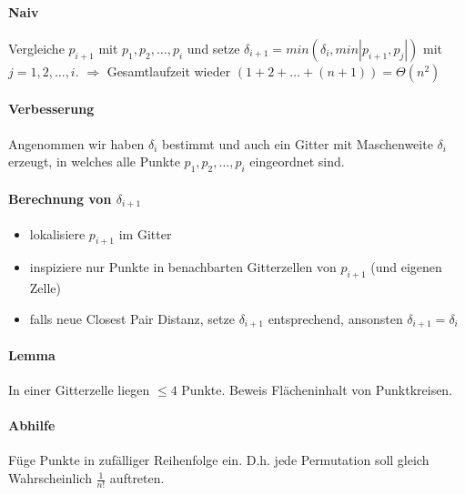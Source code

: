 \paragraph*{Naiv} Vergleiche $p_{i+1}$ mit $p_1,p_2,\dots,p_i$ und setze $\delta_{i+1} = min(\delta_i, min|p_{i+1},p_j|)$ mit $j = 1,2,\dots,i$. $\Rightarrow$ Gesamtlaufzeit wieder $(1+2+\dots+(n+1)) = \Theta(n^2)$

\paragraph*{Verbesserung} Angenommen wir haben $\delta_i$ bestimmt und auch ein Gitter mit Maschenweite $\delta_i$ erzeugt, in welches alle Punkte $p_1,p_2,\dots,p_i$ eingeordnet sind.

\paragraph*{Berechnung von $\delta_{i+1}$}
\begin{itemize}
	\item lokalisiere $p_{i+1}$ im Gitter
	\item inspiziere nur Punkte in benachbarten Gitterzellen von $p_{i+1}$ (und eigenen Zelle)
	\item falls neue Closest Pair Distanz, setze $\delta_{i+1}$ entsprechend, ansonsten $\delta_{i+1} = \delta_i$
\end{itemize}

\paragraph*{Lemma} In einer Gitterzelle liegen $\leq 4$ Punkte. Beweis Flächeninhalt von Punktkreisen.




\paragraph*{Abhilfe} Füge Punkte in zufälliger Reihenfolge ein. D.h. jede Permutation soll gleich Wahrscheinlich $\frac{1}{n!}$ auftreten. %

